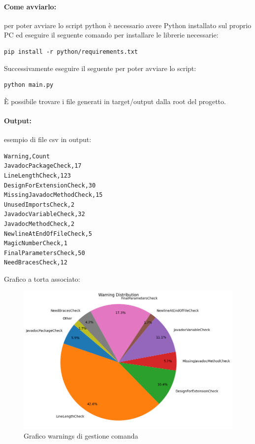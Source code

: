 \paragraph{Come avviarlo:}
per poter avviare lo script python è necessario avere Python installato sul proprio PC\cite{phoenixnap} ed eseguire il seguente comando per installare le librerie necessarie:
\begin{lstlisting}[style=terminal, 
	caption={Python - installare i pacchetti necessari}, label=lst:python-pip-install]
pip install -r python/requirements.txt
\end{lstlisting}
Successivamente eseguire il seguente per poter avviare lo script:
\begin{lstlisting}[style=terminal, 
	caption={Avvio script python}, label=lst:python-main]
python main.py
\end{lstlisting}
È possibile trovare i file generati in target/output dalla root del progetto.
\paragraph{Output:}
esempio di file csv in output:
\begin{lstlisting}[style=pythonstyle, caption={file checkstyle\_warning\_severity\_counts.csv warning di gestione comanda}, label=lst:csv-warning]
Warning,Count
JavadocPackageCheck,17
LineLengthCheck,123
DesignForExtensionCheck,30
MissingJavadocMethodCheck,15
UnusedImportsCheck,2
JavadocVariableCheck,32
JavadocMethodCheck,2
NewlineAtEndOfFileCheck,5
MagicNumberCheck,1
FinalParametersCheck,50
NeedBracesCheck,12
\end{lstlisting}
Grafico a torta associato:
\begin{figure}[htbp]
	\centering
	\includegraphics[scale=0.6]{iterazione1/images/warning_severity_distribution_pie_chart.png}
	\caption{Grafico warnings di gestione comanda\label{fig:graph_warning_gestionecomanda}}
\end{figure}
\clearpage